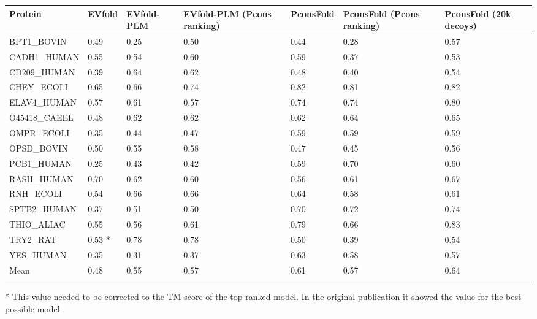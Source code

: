 \documentclass{bioinfo}
\begin{document}
\begin{table*}[!t]
{\begin{tabular}{lllllll}\toprule
Protein & EVfold & EVfold-PLM & EVfold-PLM (Pcons ranking) & PconsFold & PconsFold (Pcons ranking) & PconsFold (20k decoys)\\\midrule
BPT1\_BOVIN & 0.49 & 0.25 & 0.50 & 0.44 & 0.28 & 0.57 \\
CADH1\_HUMAN & 0.55 & 0.54 & 0.60 & 0.59 & 0.37 & 0.53 \\
CD209\_HUMAN & 0.39 & 0.64 & 0.62 & 0.48 & 0.40 & 0.54 \\
CHEY\_ECOLI & 0.65 & 0.66 & 0.74 & 0.82 &  0.81 & 0.82 \\
ELAV4\_HUMAN & 0.57 & 0.61 & 0.57 & 0.74 & 0.74 & 0.80 \\
O45418\_CAEEL & 0.48 & 0.62 & 0.62 & 0.62 & 0.64 & 0.65 \\
OMPR\_ECOLI & 0.35 & 0.44 & 0.47 & 0.59 & 0.59 & 0.59 \\
OPSD\_BOVIN & 0.50 & 0.55 & 0.58 & 0.47 & 0.45 & 0.56 \\
PCB1\_HUMAN & 0.25 & 0.43 & 0.42 & 0.59 & 0.70 & 0.60 \\
RASH\_HUMAN & 0.70 & 0.62 & 0.60 & 0.56 & 0.61& 0.67 \\
RNH\_ECOLI & 0.54 & 0.66 & 0.66 & 0.64 & 0.58& 0.61 \\
SPTB2\_HUMAN & 0.37 & 0.51 & 0.50 & 0.70 & 0.72& 0.74 \\
THIO\_ALIAC & 0.55 & 0.56 & 0.61 & 0.79 & 0.66& 0.83 \\
TRY2\_RAT & 0.53 * & 0.78 & 0.78 & 0.50 & 0.39 & 0.54 \\
YES\_HUMAN & 0.35 & 0.31 & 0.37 & 0.63 & 0.58& 0.57 \\ \midrule
Mean & 0.48 & 0.55 & 0.57 & 0.61 & 0.57& 0.64 \\ \botrule
\end{tabular}}{* This value needed to be corrected to the TM-score of the top-ranked model. In the original publication it showed the value for the best possible model.}
\end{table*}
\end{document}
